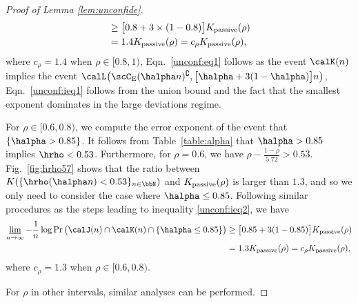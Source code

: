 \documentclass[11pt,onecolumn]{article}
\newcommand{\Passive}{{\rm passive}}
\begin{document}
\begin{proof}[Proof of Lemma \ref{lem:unconfide}]
\begin{align}
		&\geq \big[0.8+3\times(1-0.8)\big]K _{\Passive}(\rho)\\*
		&=1.4K _{\Passive}(\rho)= c_{\rho}K _{\Passive}(\rho), \label{unconf:ieq2}
	\end{align}
	where $c_{\rho}=1.4$ when $\rho\in[0.8,1)$, Eqn.~\eqref{unconf:eq1} follows as the event $\calK(n)$ implies the event $\calL\big(\scC_{\mathrm{E}}(\halpha n)^{\complement},\big[\halpha+3(1-\halpha)\big]n\big)$, Eqn.~\eqref{unconf:ieq1} follows  from the union bound and the fact that the smallest exponent dominates in the large deviations regime. 

	For $\rho\in [0.6,0.8)$, we compute the error exponent of the event that $\{\halpha >0.85\}$. It follows from Table~\ref{table:alpha} that $\halpha >0.85$ implies $\hrho<0.53$. Furthermore, for $\rho=0.6$, we have $\rho-\frac{1-\rho}{5.72}> 0.53$. Fig.~\ref{fig:hrho57} shows that the ratio between $K(\{\hrho(\halpha n)<0.53\}_{n\in\bbN})$ and $K_{\Passive}(\rho)$ is larger than $1.3$, and so we only need to consider the case where $\halpha \leq 0.85$. Following similar procedures as the steps leading to inequality \eqref{unconf:ieq2}, we have
	\begin{align}
		\varliminf_{n\rightarrow\infty}-\frac{1}{n}\log\Pr\big(\calJ(n)\cap \calK(n)\cap \{\halpha \leq 0.85\}\big)
		&\geq \big[0.85+3(1-0.85)\big]K _{\Passive}(\rho)\\*
		&=1.3K _{\Passive}(\rho)=c_{\rho}K _{\Passive}(\rho),
	\end{align}
	where $c_{\rho}=1.3$ when $\rho\in[0.6,0.8)$.

	For $\rho$ in other intervals,  similar analyses can be performed.
\end{proof}

\end{document}
